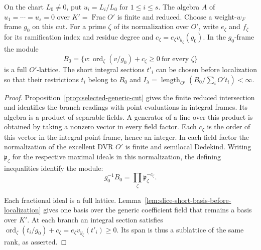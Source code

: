 \begin{established}\label{hyp:slice-chart-branch-lattices}
On the chart \(L_0\ne0\), put \(u_i=L_i/L_0\) for \(1\le i\le s\).
The algebra \(A\) of \(u_1=\cdots=u_s=0\) over \(K'=\operatorname{Frac}O'\)
is finite and reduced. Choose a weight-\(w_F\) frame \(g_0\) on this cut.
For a prime \(\zeta\) of its normalization over \(O'\), write \(e_\zeta\)
and \(f_\zeta\) for its ramification index and residue degree and
\(c_\zeta=e_\zeta v_{y_\zeta}(g_0)\). In the \(g_0\)-frame the module
\[
 B_0=\{v:\operatorname{ord}_\zeta(v/g_0)+c_\zeta\ge0
                    \ \text{for every }\zeta\}
\]
is a full \(O'\)-lattice. The short integral sections \(t'_i\) can be
chosen before localization so that their restrictions \(t_i\) belong to
\(B_0\) and \(I_\lambda=\operatorname{length}_{O'}(B_0/\sum_i O't_i)<\infty\).
\end{established}
\begin{proof}
Proposition~\ref{prop:selected-generic-cut} gives the finite reduced
intersection and identifies the branch readings with point evaluations
in integral frames. Its algebra is a product of separable fields. A
generator of a line over this product is obtained by taking a nonzero
vector in every field factor. Each \(c_\zeta\) is the order of this
vector in the integral point frame, hence an integer. In each field
factor the normalization of the excellent DVR \(O'\) is finite and
semilocal Dedekind. Writing \(\mathfrak p_\zeta\) for the respective maximal ideals in
this normalization, the defining inequalities identify the module:
\[
               g_0^{-1} B_0=\prod_\zeta\mathfrak p_\zeta^{-c_\zeta}.
\]

Each fractional ideal is a full lattice.
Lemma~\ref{lem:slice-short-basis-before-localization} gives one basis
over the generic coefficient field that remains a basis over \(K'\).
At each branch an integral section satisfies
\(\operatorname{ord}_\zeta(t_i/g_0)+c_\zeta=e_\zeta v_{y_\zeta}(t'_i)\ge0\).
Its span is thus a sublattice of the same rank, as asserted.
\end{proof}

